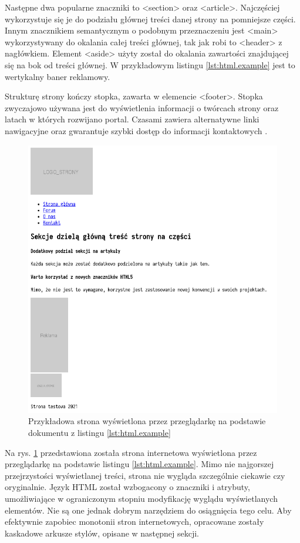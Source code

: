 Następne dwa popularne znaczniki to <section> oraz <article>. Najczęściej wykorzystuje się je do podziału głównej treści danej strony na pomniejsze części. Innym znacznikiem semantycznym o podobnym przeznaczeniu jest <main> wykorzystywany do okalania całej treści głównej, tak jak robi to <header> z nagłówkiem. Element <aside> użyty został do okalania zawartości znajdującej się na bok od treści głównej. W przykładowym listingu \ref{lst:html.example} jest to wertykalny baner reklamowy. 

Strukturę strony kończy stopka, zawarta w elemencie <footer>. Stopka zwyczajowo używana jest do wyświetlenia informacji o twórcach strony oraz latach w których rozwijano portal. Czasami zawiera alternatywne linki nawigacyjne oraz gwarantuje szybki dostęp do informacji kontaktowych \cite{Mazur.html5-css3}.

\begin{figure}[!htbp] 
    \centering
    \includegraphics[width=\textwidth]{img/chapter3/html.example.rendered.png}
    \caption{Przykładowa strona wyświetlona przez przeglądarkę na podstawie dokumentu z listingu \ref{lst:html.example}}
    \label{fig:html.example.rendered}
\end{figure}

Na rys. \ref{fig:html.example.rendered} przedstawiona została strona internetowa wyświetlona przez przeglądarkę na podstawie listingu \ref{lst:html.example}. Mimo nie najgorszej przejrzystości wyświetlanej treści, strona nie wygląda szczególnie ciekawie czy oryginalnie. Język HTML został wzbogacony o znaczniki i atrybuty, umożliwiające w ograniczonym stopniu modyfikację wyglądu wyświetlanych elementów. Nie są one jednak dobrym narzędziem do osiągnięcia tego celu. Aby efektywnie zapobiec monotonii stron internetowych, opracowane zostały kaskadowe arkusze stylów, opisane w następnej sekcji.

